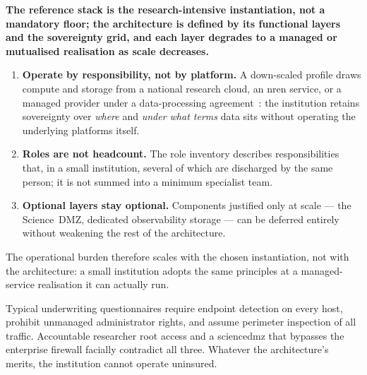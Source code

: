 \begin{answerbox}[Answer to Q9.4]
\textbf{The reference stack is the research-intensive instantiation, not a mandatory floor; the architecture is defined by its functional layers and the sovereignty grid, and each layer degrades to a managed or mutualised realisation as scale decreases.}
\begin{enumerate}[nosep]
  \item \textbf{Operate by responsibility, not by platform.} A down-scaled profile draws compute and storage from a national research cloud, an \gls{nren} service, or a managed provider under a data-processing agreement~\cite{ng-tech-ref-2026}: the institution retains sovereignty over \emph{where} and \emph{under what terms} data sits without operating the underlying platforms itself.
  \item \textbf{Roles are not headcount.} The role inventory describes responsibilities that, in a small institution, several of which are discharged by the same person; it is not summed into a minimum specialist team.
  \item \textbf{Optional layers stay optional.} Components justified only at scale --- the Science~DMZ, dedicated observability storage --- can be deferred entirely without weakening the rest of the architecture.
\end{enumerate}
\noindent The operational burden therefore scales with the chosen instantiation, not with the architecture: a small institution adopts the same principles at a managed-service realisation it can actually run.
\end{answerbox}

\bigskip

\begin{questionbox}
Typical underwriting questionnaires require endpoint detection on
every host, prohibit unmanaged administrator rights, and assume
perimeter inspection of all traffic. Accountable researcher root
access and a \gls{sciencedmz} that bypasses the enterprise firewall
facially contradict all three. Whatever the architecture's merits,
the institution cannot operate uninsured.
\end{questionbox}

